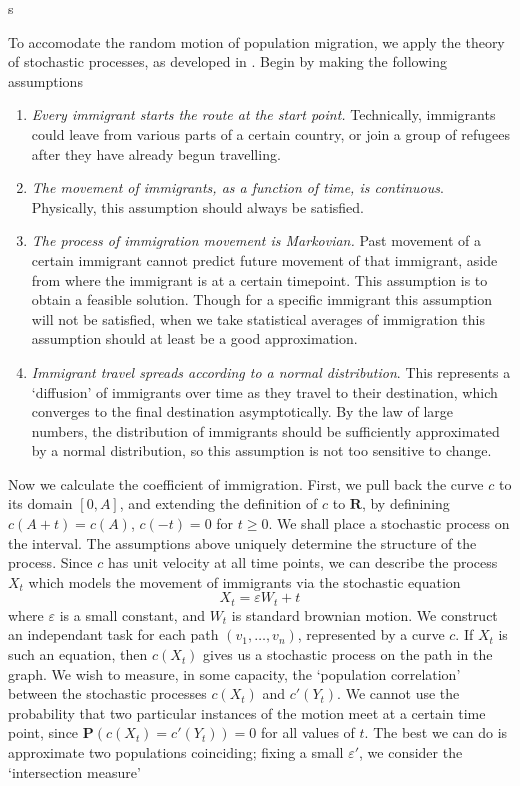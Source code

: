 \documentclass{article}
\begin{document}
\begin{enumerate}
\begin{center}
s
\end{center}

To accomodate the random motion of population migration, we apply the theory of stochastic processes, as developed in \cite{lawler}. Begin by making the following assumptions
%
\begin{enumerate}
    \item {\it Every immigrant starts the route at the start point.} Technically, immigrants could leave from various parts of a certain country, or join a group of refugees after they have already begun travelling.
    \item {\it The movement of immigrants, as a function of time, is continuous}. Physically, this assumption should always be satisfied.
    \item {\it The process of immigration movement is Markovian.} Past movement of a certain immigrant cannot predict future movement of that immigrant, aside from where the immigrant is at a certain timepoint. This assumption is to obtain a feasible solution. Though for a specific immigrant this assumption will not be satisfied, when we take statistical averages of immigration this assumption should at least be a good approximation.
    \item {\it Immigrant travel spreads according to a normal distribution}. This represents a `diffusion' of immigrants over time as they travel to their destination, which converges to the final destination asymptotically. By the law of large numbers, the distribution of immigrants should be sufficiently approximated by a normal distribution, so this assumption is not too sensitive to change.
\end{enumerate}
%
Now we calculate the coefficient of immigration. First, we pull back the curve $c$ to its domain $[0,A]$, and extending the definition of $c$ to $\mathbf{R}$, by definining $c(A + t) = c(A)$, $c(-t) = 0$ for $t \geq 0$. We shall place a stochastic process on the interval. The assumptions above uniquely determine the structure of the process. Since $c$ has unit velocity at all time points, we can describe the process $X_t$ which models the movement of immigrants via the stochastic equation
%
\[ X_t = \varepsilon W_t + t \]
%
where $\varepsilon$ is a small constant, and $W_t$ is standard brownian motion. We construct an independant task for each path $(v_1, \dots, v_n)$, represented by a curve $c$. If $X_t$ is such an equation, then $c(X_t)$ gives us a stochastic process on the path in the graph. We wish to measure, in some capacity, the `population correlation' between the stochastic processes $c(X_t)$ and $c'(Y_t)$. We cannot use the probability that two particular instances of the motion meet at a certain time point, since $\mathbf{P}(c(X_t) = c'(Y_t)) = 0$ for all values of $t$. The best we can do is approximate two populations coinciding; fixing a small $\varepsilon'$, we consider the `intersection measure'

\end{enumerate}
\end{document}
